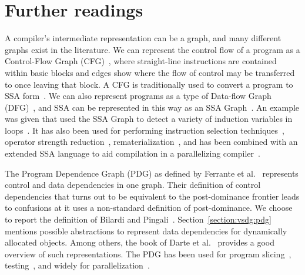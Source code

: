 {\section{Further readings}
A compiler's intermediate representation can be a graph, and many different graphs exist in the literature. 
We can represent the control flow of a program as a Control-Flow Graph (CFG)~\cite{808479}, where straight-line instructions are contained within basic blocks and edges show where the flow of control may be transferred to once leaving that block. 
A CFG is traditionally used to convert a program to SSA form~\cite{115320}. 
We can also represent programs as a type of Data-flow Graph (DFG)~\cite{dennis74first,dennis80data}, and SSA can be represented in this way as an SSA Graph~\cite{504710}. 
An example was given that used the SSA Graph to detect a variety of induction variables in loops~\cite{143131,201003}. 
It has also been used for performing instruction selection techniques~\cite{1375663,1269857}, operator strength reduction~\cite{504710}, rematerialization~\cite{143143}, and has been combined with an extended SSA language to aid compilation in a parallelizing compiler~\cite{Stoltz_extendedssa}.

The Program Dependence Graph (PDG) as defined by Ferrante et al.~\cite{ferrante87the} represents control and data dependencies in one graph. 
Their definition of control dependencies that turns out to be equivalent to the post-dominance frontier leads to confusions at it uses a non-standard definition of post-dominance. 
We choose to report the definition of Bilardi and Pingali~\cite{Bilardi1996}. 
Section~\ref{section:vsdg:pdg} mentions possible abstractions to represent data dependencies for dynamically allocated objects. 
Among others, the book of Darte et al.~\cite{DarteRV-book} provides a good overview of such representations. 
The PDG has been used for program slicing~\cite{ottenstein84program}, testing~\cite{bates93incremental}, and widely for parallelization~\cite{ferrante85on,ferrante88generating,simons90a,baxter89program}. 

}
